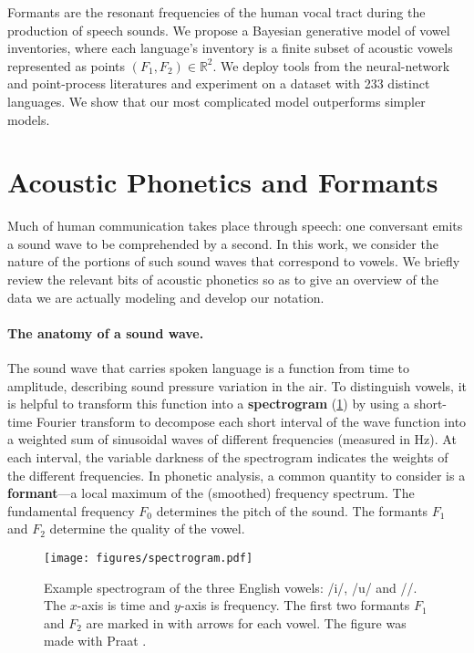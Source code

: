\documentclass[11pt,a4paper]{article}
\begin{document}
Formants are the resonant frequencies of the human vocal tract during
the production of speech sounds.
We propose a
Bayesian generative model of vowel inventories, where each language's inventory
is a finite subset of acoustic vowels represented as points $(F_1,F_2)
\in \mathbb{R}^2$.
We deploy tools from the neural-network and
point-process literatures and experiment on a dataset
with 233 distinct languages.  We show that
our most complicated model outperforms simpler
models.

\section{Acoustic Phonetics and Formants}\label{sec:phonetics}
Much of human communication takes place through speech: one conversant
emits a sound wave to be comprehended by a second. In this work, we
consider the nature of the portions of such sound waves that correspond
to vowels. We briefly review the relevant bits of acoustic
phonetics so as to give an overview of the data we are actually
modeling and develop our notation.

\paragraph{The anatomy of a sound wave.}
The sound wave that carries spoken language is a function from time to
amplitude, describing sound pressure variation in the air. To distinguish
vowels, it is helpful to transform this function into a {\bf spectrogram}
(\cref{fig:spectrogram}) by using a short-time Fourier transform \cite[Chapter 1]{deng2003speech}
to decompose each short interval of the wave function into a weighted sum of sinusoidal waves of different
frequencies (measured in Hz).  At each interval, the variable darkness of the spectrogram indicates the weights
of the different frequencies. In phonetic
analysis, a common quantity to consider is a {\bf formant}---a local maximum
of the (smoothed) frequency spectrum. The fundamental frequency $F_0$ determines
the pitch of the sound. The formants $F_1$ and $F_2$ determine the quality of the vowel.

\begin{figure}
  \centering
  \texttt{[image: figures/spectrogram.pdf]}
  \caption{Example spectrogram of the three English vowels: /i/, /u/ and //. The $x$-axis is time and $y$-axis is frequency. The first two formants $F_1$ and $F_2$
    are marked in with arrows for each vowel. The figure was made with Praat \cite{boersma2002praat}.}
  \label{fig:spectrogram}
\end{figure}
\end{document}

